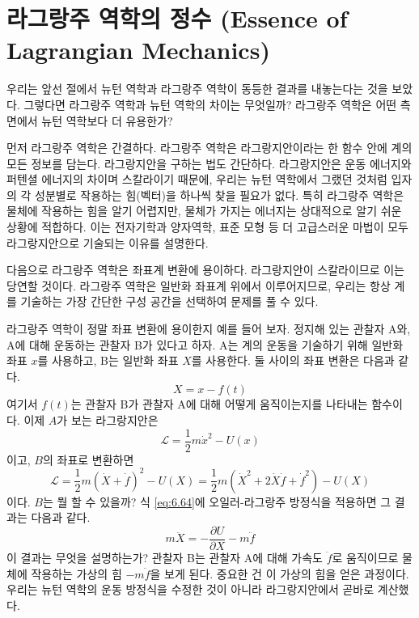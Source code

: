\documentclass[chapter, oneside, b5paper]{oblivoir}
\theoremstyle{plain}
\theoremstyle{definition}
\theoremstyle{remark}
\begin{document}
\section{라그랑주 역학의 정수 (Essence of Lagrangian Mechanics)}
우리는 앞선 절에서 뉴턴 역학과 라그랑주 역학이 동등한 결과를 내놓는다는 것을 보았다. 그렇다면 라그랑주 역학과 뉴턴 역학의 차이는 무엇일까? 라그랑주 역학은 어떤 측면에서 뉴턴 역학보다 더 유용한가?

먼저 라그랑주 역학은 간결하다. 라그랑주 역학은 라그랑지안이라는 한 함수 안에 계의 모든 정보를 담는다. 라그랑지안을 구하는 법도 간단하다. 라그랑지안은 운동 에너지와 퍼텐셜 에너지의 차이며 스칼라이기 때문에, 우리는 뉴턴 역학에서 그랬던 것처럼 입자의 각 성분별로 작용하는 힘(벡터)을 하나씩 찾을 필요가 없다. 특히 라그랑주 역학은 물체에 작용하는 힘을 알기 어렵지만, 물체가 가지는 에너지는 상대적으로 알기 쉬운 상황에 적합하다. 이는 전자기학과 양자역학, 표준 모형 등 더 고급스러운 마법이 모두 라그랑지안으로 기술되는 이유를 설명한다.

다음으로 라그랑주 역학은 좌표계 변환에 용이하다. 라그랑지안이 스칼라이므로 이는 당연할 것이다. 라그랑주 역학은 일반화 좌표계 위에서 이루어지므로, 우리는 항상 계를 기술하는 가장 간단한 구성 공간을 선택하여 문제를 풀 수 있다.

라그랑주 역학이 정말 좌표 변환에 용이한지 예를 들어 보자. 정지해 있는 관찰자 A와, A에 대해 운동하는 관찰자 B가 있다고 하자. A는 계의 운동을 기술하기 위해 일반화 좌표 $x$를 사용하고, B는 일반화 좌표 $X$를 사용한다. 둘 사이의 좌표 변환은 다음과 같다.
\begin{equation}
    X = x - f(t) \label{eq:6.62}
\end{equation}
여기서 $f(t)$는 관찰자 B가 관찰자 A에 대해 어떻게 움직이는지를 나타내는 함수이다. 이제 $A$가 보는 라그랑지안은
\begin{equation}
    \mathcal{L} = \frac{1}{2}m\dot{x}^2 - U(x)
\end{equation}
이고, $B$의 좌표로 변환하면
\begin{equation}
    \mathcal{L} = \frac{1}{2}m(\dot{X}+\dot{f})^2 - U(X) = \frac{1}{2}m( \dot{X}^2 + 2\dot{X}\dot{f} + \dot{f}^2) - U(X) \label{eq:6.64}
\end{equation}
이다. $B$는 뭘 할 수 있을까? 식 \ref{eq:6.64}에 오일러-라그랑주 방정식을 적용하면 그 결과는 다음과 같다.
\begin{equation}
    m \ddot{X} = -\frac{\partial U}{\partial X} - m \ddot{f}
\end{equation}
이 결과는 무엇을 설명하는가? 관찰자 B는 관찰자 A에 대해 가속도 $\ddot{f}$로 움직이므로 물체에 작용하는 가상의 힘 $-m\ddot{f}$을 보게 된다. 중요한 건 이 가상의 힘을 얻은 과정이다. 우리는 뉴턴 역학의 운동 방정식을 수정한 것이 아니라 라그랑지안에서 곧바로 계산했다.
\end{document}
